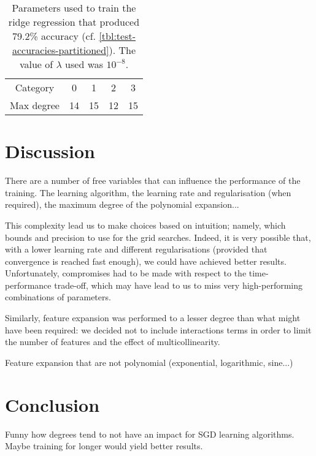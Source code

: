 \documentclass[10pt,conference,compsocconf]{IEEEtran}
\begin{document}
\begin{table}
  \centering
  \begin{tabular}{ |c|c|c|c|c| } 
    \hline 
    Category   & 0  & 1  & 2  & 3  \\
    Max degree & 14 & 15 & 12 & 15 \\
    \hline
  \end{tabular}
  \caption{Parameters used to train the ridge regression that produced 79.2\% accuracy (cf. \autoref{tbl:test-accuracies-partitioned}). The value of $\lambda$ used was $10^{-8}$.}
  \label{tbl:parameters-ridge-partitioned}
\end{table}

\section{Discussion}
There are a number of free variables that can influence the performance
of the training. The learning algorithm, the learning rate and regularisation
(when required), the maximum degree of the polynomial expansion...

This complexity lead us to make choices based on intuition; namely,
which bounds and precision to use for the grid searches.
Indeed, it is very possible that, with a lower learning rate and
different regularisations (provided that convergence is reached fast
enough), we could have achieved better results.
Unfortunately, compromises had to be made with respect to the 
time-performance trade-off, which may have lead to us to
miss very high-performing combinations of parameters.

Similarly, feature expansion was performed to a lesser degree than
what might have been required: we decided not to include interactions
terms in order to limit the number of features and the effect of
multicollinearity.

Feature expansion that are not polynomial (exponential, logarithmic, sine...)

\section{Conclusion}
Funny how degrees tend to not have an impact for SGD learning algorithms.
Maybe training for longer would yield better results.




\end{document}
